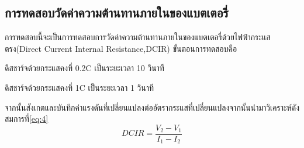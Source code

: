 \subsection{การทดสอบวัดค่าความต้านทานภายในของแบตเตอรี่}
การทดสอบนี้จะเป็นการทดสอบการวัดค่าความต้านทานภายในของแบตเตอรี่ด้วยไฟฟ้ากระแสตรง(Direct Current Internal Resistance,DCIR)
ขั้นตอนการทดสอบคือ
\begin{enumerate}
{\item ดิสชาร์จด้วยกระแสคงที่ 0.2C เป็นระยะเวลา 10 วินาที}
{\item ดิสชาร์จด้วยกระแสคงที่ 1C เป็นระยะเวลา 1 วินาที}
\end{enumerate}
จากนั้นสังเกตและบันทึกค่าแรงดันที่เปลี่ยนแปลงต่ออัตรากระแสที่เปลี่ยนแปลงจากนั้นนำมาวิเคราะห์ดังสมการที่\ref{eq:4}
\begin{equation} \label{eq:4}
DCIR = \frac{V_2-V_1}{I_1-I_2} 
\end{equation}
